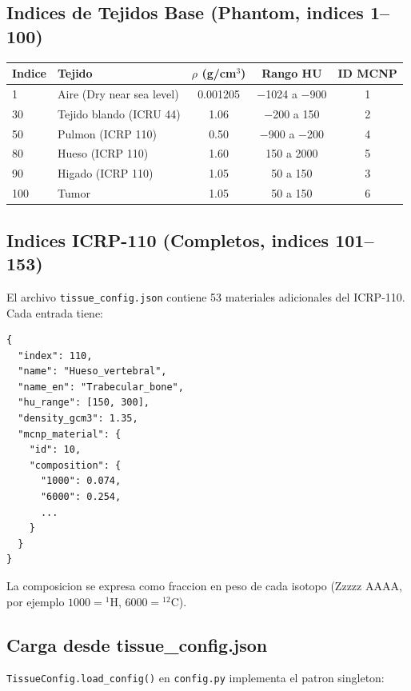 \documentclass[12pt,a4paper]{article}
\begin{document}
\subsection{Indices de Tejidos Base (Phantom, indices 1--100)}

\begin{center}
\begin{tabular}{llccc}
\toprule
\textbf{Indice} & \textbf{Tejido} & $\rho$ (g/cm$^3$) & \textbf{Rango HU} & \textbf{ID MCNP} \\
\midrule
1 & Aire (Dry near sea level) & 0.001205 & $-$1024 a $-$900 & 1 \\
30 & Tejido blando (ICRU 44) & 1.06 & $-$200 a 150 & 2 \\
50 & Pulmon (ICRP 110) & 0.50 & $-$900 a $-$200 & 4 \\
80 & Hueso (ICRP 110) & 1.60 & 150 a 2000 & 5 \\
90 & Higado (ICRP 110) & 1.05 & 50 a 150 & 3 \\
100 & Tumor & 1.05 & 50 a 150 & 6 \\
\bottomrule
\end{tabular}
\end{center}

\subsection{Indices ICRP-110 (Completos, indices 101--153)}

El archivo \texttt{tissue\_config.json} contiene 53 materiales adicionales del ICRP-110. Cada entrada tiene:

\begin{verbatim}
{
  "index": 110,
  "name": "Hueso_vertebral",
  "name_en": "Trabecular_bone",
  "hu_range": [150, 300],
  "density_gcm3": 1.35,
  "mcnp_material": {
    "id": 10,
    "composition": {
      "1000": 0.074,
      "6000": 0.254,
      ...
    }
  }
}
\end{verbatim}

La composicion se expresa como fraccion en peso de cada isotopo (Zzzzz AAAA, por ejemplo $1000 = {}^1$H, $6000 = {}^{12}$C).

\subsection{Carga desde tissue\_config.json}

\texttt{TissueConfig.load\_config()} en \texttt{config.py} implementa el patron singleton:
\end{document}
